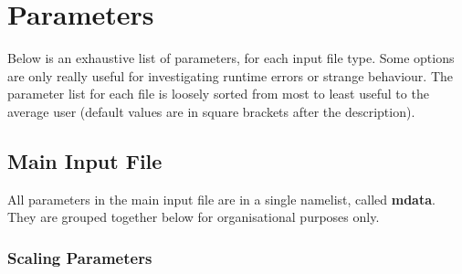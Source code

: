 \documentclass[12pt]{article}%
\begin{document}





\newpage

\section{Parameters}


Below is an exhaustive list of parameters, for each input file type. Some options are only really useful for investigating runtime errors or strange behaviour. The parameter list for each file is loosely sorted from most to least useful to the average user (default values are in square brackets after the description).


\subsection{Main Input File}


All parameters in the main input file are in a single namelist, called {\bf mdata}. They are grouped together below for organisational purposes only.

\subsubsection{Scaling Parameters}
\end{document}
